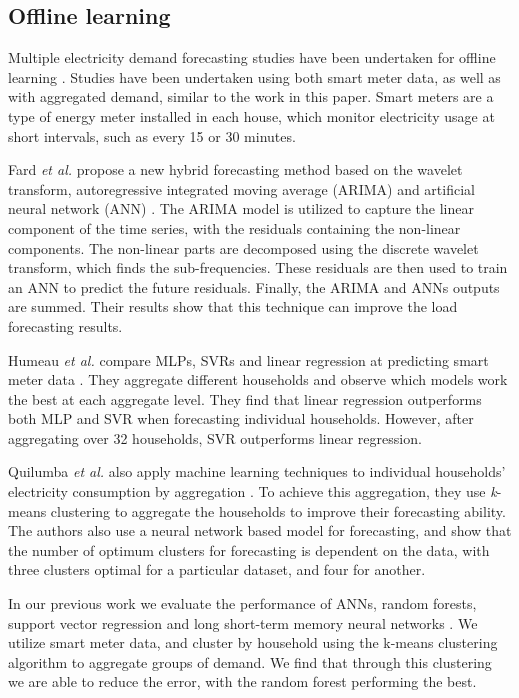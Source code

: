 \subsection{Offline learning}

Multiple electricity demand forecasting studies have been undertaken for offline learning \cite{Chen2004, Gross1987, Ghofrani}. Studies have been undertaken using both smart meter data, as well as with aggregated demand, similar to the work in this paper. Smart meters are a type of energy meter installed in each house, which monitor electricity usage at short intervals, such as every 15 or 30 minutes.


Fard \textit{et al.} propose a new hybrid forecasting method based on the wavelet transform, autoregressive integrated moving average (ARIMA) and artificial neural network (ANN) \cite{Fard2014}. The ARIMA model is utilized to capture the linear component of the time series, with the residuals containing the non-linear components. The non-linear parts are decomposed using the discrete wavelet transform, which finds the sub-frequencies. These residuals are then used to train an ANN  to predict the future residuals. Finally, the ARIMA and ANNs outputs are summed. Their results show that this technique can improve the load forecasting results.    

Humeau \textit{et al.} compare MLPs, SVRs and linear regression at predicting smart meter data \cite{Humeau2013}. They aggregate different households and observe which models work the best at each aggregate level. They find that linear regression outperforms both MLP and SVR when forecasting individual households. However, after aggregating over 32 households, SVR outperforms linear regression.


Quilumba \textit{et al.} also apply machine learning techniques to individual households' electricity consumption by aggregation \cite{Fard2014}. To achieve this aggregation, they use \textit{k}-means clustering to aggregate the households to improve their forecasting ability. The authors also use a neural network based model for forecasting, and show that the number of optimum clusters for forecasting is dependent on the data, with three clusters optimal for a particular dataset, and four for another.

In our previous work we evaluate the performance of ANNs, random forests, support vector regression and long short-term memory neural networks \cite{Kell2018a}. We utilize smart meter data, and cluster by household using the k-means clustering algorithm to aggregate groups of demand. We find that through this clustering we are able to reduce the error, with the random forest performing the best.

